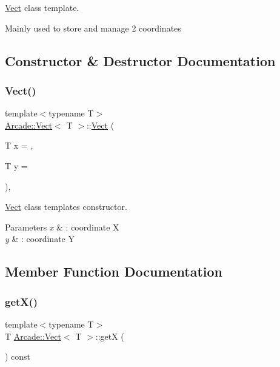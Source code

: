 \hyperlink{class_arcade_1_1_vect}{Vect} class template. 

Mainly used to store and manage 2 coordinates 

\subsection{Constructor \& Destructor Documentation}
\mbox{\label{class_arcade_1_1_vect_a9563cff4e95df68c9c39af00ba537d45}} 
\subsubsection{\texorpdfstring{Vect()}{Vect()}}
{\footnotesize\ttfamily template$<$typename T$>$ \\
\hyperlink{class_arcade_1_1_vect}{Arcade\+::\+Vect}$<$ T $>$\+::\hyperlink{class_arcade_1_1_vect}{Vect} (\begin{DoxyParamCaption}\item[{T}]{x = {},  }\item[{T}]{y = {} }\end{DoxyParamCaption})\hspace{0.3cm}{\ttfamily [inline]}, {\ttfamily [explicit]}}



\hyperlink{class_arcade_1_1_vect}{Vect} class template\textquotesingle{}s constructor. 


\begin{DoxyParams}{Parameters}
{\em x} & \+: coordinate X \\
\hline
{\em y} & \+: coordinate Y \\
\hline
\end{DoxyParams}


\subsection{Member Function Documentation}
\mbox{\label{class_arcade_1_1_vect_a07237933a773c4f626a89415846886f1}} 
\subsubsection{\texorpdfstring{get\+X()}{getX()}}
{\footnotesize\ttfamily template$<$typename T$>$ \\
T \hyperlink{class_arcade_1_1_vect}{Arcade\+::\+Vect}$<$ T $>$\+::getX (\begin{DoxyParamCaption}{ }\end{DoxyParamCaption}) const\hspace{0.3cm}{\ttfamily [inline]}}



